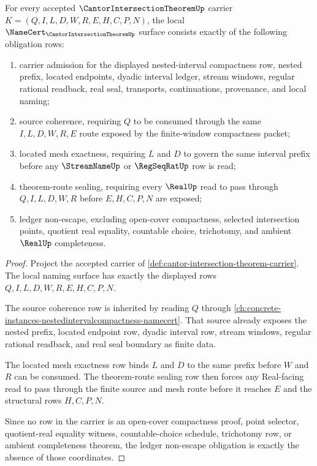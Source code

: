 \begin{theorem}
\label{thm:cantor-intersection-theorem-namecert-obligations}
For every accepted $\CantorIntersectionTheoremUp$ carrier $K=(Q,I,L,D,W,R,E,H,C,P,N)$, the local $\NameCert_{\CantorIntersectionTheoremUp}$ surface consists exactly of the following obligation rows:
\begin{enumerate}
\item carrier admission for the displayed nested-interval compactness row, nested prefix, located endpoints, dyadic interval ledger, stream windows, regular rational readback, real seal, transports, continuations, provenance, and local naming;
\item source coherence, requiring $Q$ to be consumed through the same $I,L,D,W,R,E$ route exposed by the finite-window compactness packet;
\item located mesh exactness, requiring $L$ and $D$ to govern the same interval prefix before any $\StreamNameUp$ or $\RegSeqRatUp$ row is read;
\item theorem-route sealing, requiring every $\RealUp$ read to pass through $Q,I,L,D,W,R$ before $E,H,C,P,N$ are exposed;
\item ledger non-escape, excluding open-cover compactness, selected intersection points, quotient real equality, countable choice, trichotomy, and ambient $\RealUp$ completeness.
\end{enumerate}
\end{theorem}
\begin{proof}
Project the accepted carrier of \autoref{def:cantor-intersection-theorem-carrier}. The local naming surface has exactly the displayed rows $Q,I,L,D,W,R,E,H,C,P,N$.

The source coherence row is inherited by reading $Q$ through \autoref{ch:concrete-instances-nestedintervalcompactness-namecert}. That source already exposes the nested prefix, located endpoint row, dyadic interval row, stream windows, regular rational readback, and real seal boundary as finite data.

The located mesh exactness row binds $L$ and $D$ to the same prefix before $W$ and $R$ can be consumed. The theorem-route sealing row then forces any Real-facing read to pass through the finite source and mesh route before it reaches $E$ and the structural rows $H,C,P,N$.

Since no row in the carrier is an open-cover compactness proof, point selector, quotient-real equality witness, countable-choice schedule, trichotomy row, or ambient completeness theorem, the ledger non-escape obligation is exactly the absence of those coordinates.
\end{proof}

